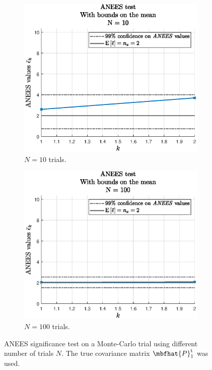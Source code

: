 \documentclass{simple-article}
\begin{document}
\begin{figure}[H]
  \centering
  \begin{subfigure}{0.45\textwidth}
    \includegraphics[width=\textwidth]{figs/anees_N10.eps}
    \caption{$N=10$ trials.}
    \label{fig:anees_N10}
  \end{subfigure}
  \begin{subfigure}{0.45\textwidth}
    \includegraphics[width=\textwidth]{figs/anees_N100.eps}
    \caption{$N=100$ trials.}
    \label{fig:anees_N100}
  \end{subfigure}
  \caption{ANEES significance test on a Monte-Carlo trial using different number of trials $N$. The true covariance matrix $\mbfhat{P}_{1}^{\mathrm{t}}$ was used.}
  \label{fig:ANEES KF MCT true P}
\end{figure}
\end{document}

